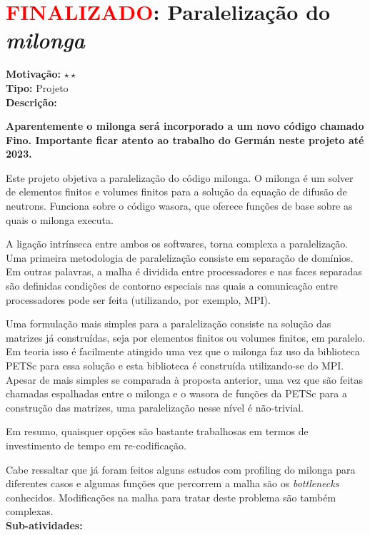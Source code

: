 \chapter{\textcolor{red}{FINALIZADO}: Paralelização do \textit{milonga}}

\textbf{Motivação:} $\star\star$\\

\textbf{Tipo:} Projeto\\

\textbf{Descrição:}

\textbf{Aparentemente o milonga será incorporado a um novo código chamado Fino.
  Importante ficar atento ao trabalho do Germán neste projeto até 2023.}

Este projeto objetiva a paralelização do código milonga. O milonga é um solver 
de elementos finitos e volumes finitos para a solução da equação de difusão de 
neutrons. Funciona sobre o código wasora, que oferece funções de base sobre as 
quais o milonga executa.

A ligação intrínseca entre ambos os softwares, torna complexa a paralelização. 
Uma primeira metodologia de paralelização consiste em separação de domínios. 
Em outras palavras, a malha é dividida entre processadores e nas faces separadas 
são definidas condições de contorno especiais nas quais a comunicação entre 
processadores pode ser feita (utilizando, por exemplo, MPI).

Uma formulação mais simples para a paralelização consiste na solução das matrizes 
já construídas, seja por elementos finitos ou volumes finitos, em paralelo. Em 
teoria isso é facilmente atingido uma vez que o milonga faz uso da biblioteca 
PETSc para essa solução e esta biblioteca é construída utilizando-se do MPI. 
Apesar de mais simples se comparada à proposta anterior, uma vez que são feitas 
chamadas espalhadas entre o milonga e o wasora de funções da PETSc para a construção das matrizes, uma paralelização nesse nível é não-trivial.

Em resumo, quaisquer opções são bastante trabalhosas em termos de investimento 
de tempo em re-codificação.

Cabe ressaltar que já foram feitos alguns estudos com profiling do milonga para 
diferentes casos e algumas funções que percorrem a malha são os \textit{bottlenecks} conhecidos. Modificações na malha para tratar deste problema 
são também complexas.\\

\textbf{Sub-atividades:}

